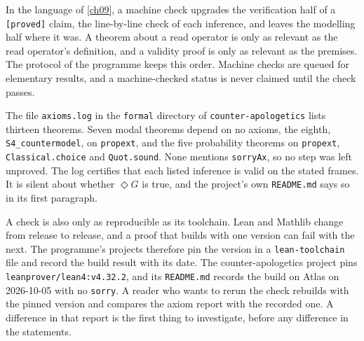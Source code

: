 In the language of \cref{ch09}, a machine check upgrades the verification half of a \texttt{[proved]} claim, the line-by-line check of each inference, and leaves the modelling half where it was. A theorem about a read operator is only as relevant as the read operator's definition, and a validity proof is only as relevant as the premises. The protocol of the programme keeps this order. Machine checks are queued for elementary results, and a machine-checked status is never claimed until the check passes.

\begin{example}\label{ex:ch10:audit}
The file \texttt{axioms.log} in the \texttt{formal} directory of \texttt{counter-apologetics} lists thirteen theorems. Seven modal theorems depend on no axioms, the eighth, \texttt{S4\_countermodel}, on \texttt{propext}, and the five probability theorems on \texttt{propext}, \texttt{Classical.choice} and \texttt{Quot.sound}. None mentions \texttt{sorryAx}, so no step was left unproved. The log certifies that each listed inference is valid on the stated frames. It is silent about whether $\Diamond G$ is true, and the project's own \texttt{README.md} says so in its first paragraph.
\end{example}

A check is also only as reproducible as its toolchain. Lean and Mathlib change from release to release, and a proof that builds with one version can fail with the next. The programme's projects therefore pin the version in a \texttt{lean-toolchain} file and record the build result with its date. The counter-apologetics project pins \texttt{leanprover/lean4:v4.32.2}, and its \texttt{README.md} records the build on Atlas on 2026-10-05 with no \texttt{sorry}. A reader who wants to rerun the check rebuilds with the pinned version and compares the axiom report with the recorded one. A difference in that report is the first thing to investigate, before any difference in the statements.


